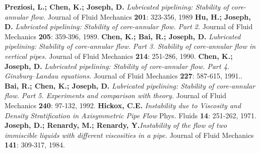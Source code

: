 \begin{thebibliography}{1}
\textbf{Preziosi, L.; Chen, K.; Joseph, D.} \textsl{Lubricated pipelining: Stability of core-annular flow.} Journal of Fluid Mechanics \textbf{201}: 323-356, 1989
\textbf{Hu, H.; Joseph, D.} \textsl{Lubricated pipelining: Stability of core-annular flow. Part 2.} Journal of Fluid Mechanics \textbf{205}: 359-396, 1989.
\textbf{Chen, K.; Bai, R.; Joseph, D.} \textsl{Lubricated pipelining: Stability of core-annular flow. Part 3. Stability of core-annular flow in vertical pipes.} Journal of Fluid Mechanics \textbf{214}: 251-286, 1990.
\textbf{Chen, K.; Joseph, D.} \textsl{Lubricated pipelining: Stability of core-annular flow. Part 4. Ginzburg–Landau equations.} Journal of Fluid Mechanics \textbf{227}: 587-615, 1991..
\textbf{Bai, R.; Chen, K.; Joseph, D.} \textsl{Lubricated pipelining: Stability of core-annular flow. Part 5. Experiments and comparison with theory.} Journal of Fluid Mechanics \textbf{240}: 97-132, 1992.
\textbf{Hickox, C.E.} \textsl{Instability due to Viscosity and Density Stratification in Axisymmetric Pipe Flow} Phys. Fluids \textbf{14}: 251-262, 1971.
\textbf{Joseph, D.; Renardy, M.; Renardy, Y.}\textsl{Instability of the flow of two immiscible liquids with different viscosities in a pipe.} Journal of Fluid Mechanics \textbf{141}: 309-317, 1984.
\end{thebibliography}

